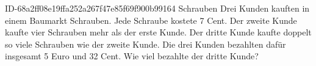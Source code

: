 \begin{exercise}
      {ID-68a2ff08e19ffa252a267f47e85f69f900b99164}
      {Schrauben}
  \ifproblem\problem
    Drei Kunden kauften in einem Baumarkt Schrauben. Jede Schraube kostete
    7 Cent. Der zweite Kunde kaufte vier Schrauben mehr als der erste Kunde.
    Der dritte Kunde kaufte doppelt so viele Schrauben wie der zweite Kunde.
    Die drei Kunden bezahlten dafür insgesamt 5 Euro und 32 Cent.
    Wie viel bezahlte der dritte Kunde?
  \fi
\end{exercise}
